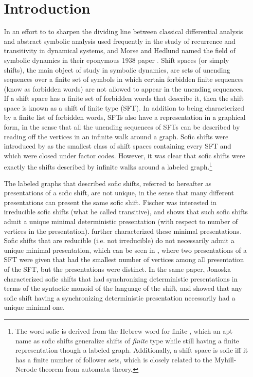 \documentclass[hidelinks]{report}
\theoremstyle{definition}
\begin{document}
\setcounter{page}{3}
\tableofcontents

\chapter{Introduction}



In an effort to to sharpen the dividing 
line between classical differential analysis and abstract symbolic analysis
used frequently in the study of recurrence and transitivity in dynamical systems, 
and Morse and Hedlund named the field of symbolic dynamics in their eponymous 
1938 paper \cite{morse1938symbolic}. Shift spaces (or simply shifts), the main object 
of study in symbolic dynamics, are sets of unending sequences over a finite set of 
symbols in which certain forbidden finite sequences (know as forbidden words)
are not allowed to appear in the unending sequences. If a shift space has a finite set of 
forbidden words that describe it, then the shift space is known as a shift 
of finite type (SFT). In addition to being characterized by a 
finite list of forbidden words, SFTs also have a representation in a graphical 
form, in the sense that all the unending sequences of SFTs can be 
described by reading off the vertices in an infinite walk around a graph.
Sofic shifts were introduced by \cite{weiss1973subshifts} as the smallest 
class of shift spaces containing every SFT and which were closed under 
factor codes. However, it was clear that sofic 
shifts were exactly the shifts described by infinite walks around 
a labeled graph.\footnote{The word sofic is derived from the Hebrew word 
for finite \cite{lind1995introduction}, which an apt name as sofic shifts 
generalize shifts of \textit{finite} type while still having a finite 
representation though a labeled graph. Additionally, a shift space is sofic 
iff it has a finite number of follower sets, which is closely related 
to the Myhill-Nerode theorem from automata theory.}

The labeled graphs that described sofic shifts, referred to hereafter as presentations
of a sofic shift, are not unique, in the sense that many different presentations 
can present the same sofic shift. Fischer \cite{fischer1975sofic} was interested in 
irreducible sofic shifts (what he called transitive), and shows that such sofic shifts admit 
a unique minimal deterministic presentation (with respect to number of vertices in the presentation).
\cite{jonoska1994minimal} further characterized these minimal presentations.
Sofic shifts that are reducible (i.e. not irreducible) do not 
necessarily admit a unique minimal presentation, which can be seen in \cite{jonoska1996sofic},  
where two presentations of a SFT were given that had the smallest number of 
vertices among all presentation of the SFT, but the presentations were distinct.
In the same paper, Jonoska characterized sofic shifts that had
synchronizing deterministic presentations in terms of the syntactic monoid 
of the language of the shift, and showed that any sofic shift having 
a synchronizing deterministic presentation necessarily had a unique 
minimal one.
\end{document}
